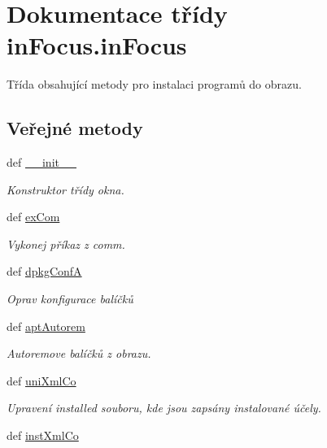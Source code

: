 \hypertarget{classinFocus_1_1inFocus}{\section{Dokumentace třídy in\-Focus.\-in\-Focus}
\label{d3/d33/classinFocus_1_1inFocus}
}


Třída obsahující metody pro instalaci programů do obrazu.  


\subsection*{Veřejné metody}
\begin{DoxyCompactItemize}
\item 
def \hyperlink{classinFocus_1_1inFocus_ac06f16bae334520e5c694b44bd2b1826}{\-\_\-\-\_\-init\-\_\-\-\_\-}
\begin{DoxyCompactList}\small\item\em Konstruktor třídy okna. \end{DoxyCompactList}\item 
def \hyperlink{classinFocus_1_1inFocus_a90c0fe90323d95c8f49e138c77d10cdf}{ex\-Com}
\begin{DoxyCompactList}\small\item\em Vykonej příkaz z comm. \end{DoxyCompactList}\item 
def \hyperlink{classinFocus_1_1inFocus_ad9f1d2f40a345051f143e7d9e7b534ab}{dpkg\-Conf\-A}
\begin{DoxyCompactList}\small\item\em Oprav konfigurace balíčků \end{DoxyCompactList}\item 
def \hyperlink{classinFocus_1_1inFocus_aed0d44b93cad2d1f8779b1ede9755a4f}{apt\-Autorem}
\begin{DoxyCompactList}\small\item\em Autoremove balíčků z obrazu. \end{DoxyCompactList}\item 
def \hyperlink{classinFocus_1_1inFocus_a64cbd33ed3dcf62bb6ab44de37cddba1}{uni\-Xml\-Co}
\begin{DoxyCompactList}\small\item\em Upravení installed souboru, kde jsou zapsány instalované účely. \end{DoxyCompactList}\item 
def \hyperlink{classinFocus_1_1inFocus_ad8ae29f519ec260560e3f3f33076add3}{inst\-Xml\-Co}

\end{DoxyCompactItemize}
